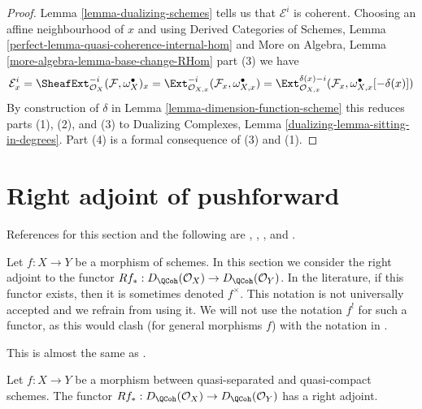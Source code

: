 \begin{proof}
Lemma \ref{lemma-dualizing-schemes} tells us that $\mathcal{E}^i$
is coherent. Choosing an affine neighbourhood of $x$ and using
Derived Categories of Schemes, Lemma
\ref{perfect-lemma-quasi-coherence-internal-hom}
and
More on Algebra, Lemma
\ref{more-algebra-lemma-base-change-RHom} part (3)
we have
$$
\mathcal{E}^i_x =
\SheafExt^{-i}_{\mathcal{O}_X}(\mathcal{F}, \omega_X^\bullet)_x =
\Ext^{-i}_{\mathcal{O}_{X, x}}(\mathcal{F}_x,
\omega_{X, x}^\bullet) =
\Ext^{\delta(x) - i}_{\mathcal{O}_{X, x}}(\mathcal{F}_x,
\omega_{X, x}^\bullet[-\delta(x)])
$$
By construction of $\delta$ in Lemma \ref{lemma-dimension-function-scheme}
this reduces parts (1), (2), and (3) to
Dualizing Complexes, Lemma \ref{dualizing-lemma-sitting-in-degrees}.
Part (4) is a formal consequence of (3) and (1).
\end{proof}




\section{Right adjoint of pushforward}
\label{section-twisted-inverse-image}

\noindent
References for this section and the following are
\cite{Neeman-Grothendieck}, \cite{LN},
\cite{Lipman-notes}, and \cite{Neeman-improvement}.

\medskip\noindent
Let $f : X \to Y$ be a morphism of schemes.
In this section we consider the right adjoint to the functor
$Rf_* : D_\QCoh(\mathcal{O}_X) \to D_\QCoh(\mathcal{O}_Y)$.
In the literature, if this functor exists, then it is sometimes
denoted $f^{\times}$. This notation is not universally accepted and we refrain
from using it. We will not use the notation $f^!$ for such a functor,
as this would clash (for general morphisms $f$) with the notation in
\cite{RD}.

\begin{lemma}
\label{lemma-twisted-inverse-image}
\begin{reference}
This is almost the same as \cite[Example 4.2]{Neeman-Grothendieck}.
\end{reference}
Let $f : X \to Y$ be a morphism between quasi-separated and quasi-compact
schemes. The functor $Rf_* : D_\QCoh(\mathcal{O}_X) \to D_\QCoh(\mathcal{O}_Y)$
has a right adjoint.
\end{lemma}

